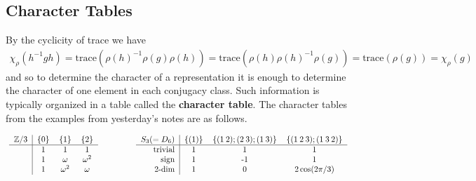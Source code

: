 \subsection{Character Tables}
By the cyclicity of trace we have
\begin{align*}
	\chi_\rho(h^{-1}gh) = \mathrm{trace}(\rho(h)^{-1} \rho(g) \rho(h)) = \mathrm{trace}(\rho(h)\rho(h)^{-1} \rho(g)) = \mathrm{trace}(\rho(g)) = \chi_\rho(g)
\end{align*}
and so to determine the character of a representation it is enough to determine the character of one element in each conjugacy class. Such information is typically organized in a table called the \textbf{character table}. The character tables from the examples from yesterday's notes are as follows.

\begin{align*}
	\mbox{
	\begin{tabular}{r|ccc}
	$\Z/3$      & \{0\}     & \{1\}                              & \{2\}                                \\
	\hline
	            & 1         & 1                                  & 1                                    \\
	            & 1         & $\omega$                           & $\omega^2$                           \\
	            & 1         & $\omega^2$                         & $\omega$
	\end{tabular}
	}
	&\qquad \qquad
	\mbox{
	\begin{tabular}{r|ccc}
	$S_3(=D_6)$ & $\{(1)\}$ & $\{(1 \: 2); (2 \: 3); (1 \: 3)\}$ & $\{ (1 \: 2 \: 3); (1 \: 3 \: 2) \}$ \\
	\hline
	trivial     & 1         & 1                                  & 1                                    \\
	sign        & 1         & -1                                 & 1                                    \\
	2-dim       & 1         & 0                                  & $2\cos(2 \pi / 3)$
	\end{tabular}
	}
\end{align*}

\begin{center}

\end{center}

\begin{center}

\end{center}

